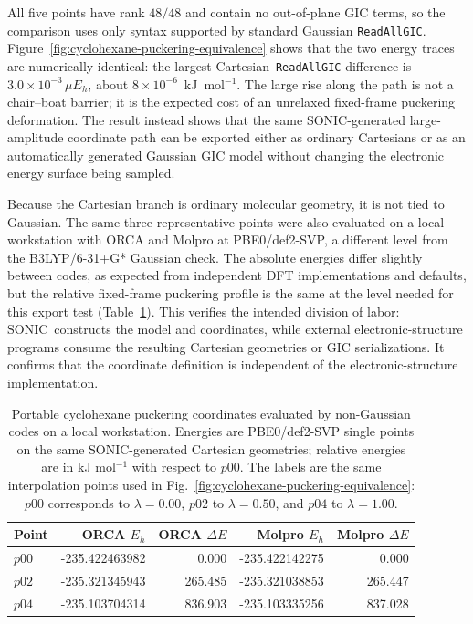 \documentclass[journal=jctcce,manuscript=article,layout=traditional]{achemso}
\newcommand{\SONIC}{SONIC}
\theoremstyle{definition}
\begin{document}
All five points have rank \(48/48\) and contain no out-of-plane GIC terms, so
the comparison uses only syntax supported by standard Gaussian
\texttt{ReadAllGIC}.  Figure~\ref{fig:cyclohexane-puckering-equivalence} shows
that the two energy traces are numerically identical: the largest
Cartesian--\texttt{ReadAllGIC} difference is \(3.0\times10^{-3}\,\mu E_h\),
about \(8\times10^{-6}\)~kJ~mol\(^{-1}\).  The large rise along the path is not
a chair--boat barrier; it is the expected cost of an unrelaxed fixed-frame
puckering deformation.  The result instead shows that the same \SONIC{}-generated
large-amplitude coordinate path can be exported either as ordinary Cartesians or
as an automatically generated Gaussian GIC model without changing the electronic
energy surface being sampled.

Because the Cartesian branch is ordinary molecular geometry, it is not tied to
Gaussian.  The same three representative points were also evaluated on a local
workstation with ORCA and Molpro at PBE0/def2-SVP, a different level from
the B3LYP/6-31+G* Gaussian check.  The absolute energies differ slightly
between codes, as expected from independent DFT implementations and defaults,
but the relative fixed-frame puckering profile is the same at the level needed
for this export test (Table~\ref{tab:external-codes}).  This verifies the
intended division of labor: \SONIC\ constructs the model and coordinates, while
external electronic-structure programs consume the resulting Cartesian
geometries or GIC serializations.  It confirms that the coordinate definition is
independent of the electronic-structure implementation.

\begin{table}[htbp]
\centering
\caption{Portable cyclohexane puckering coordinates evaluated by non-Gaussian
codes on a local workstation.  Energies are PBE0/def2-SVP single points on the same
\SONIC{}-generated Cartesian geometries; relative energies are in kJ mol\(^{-1}\)
with respect to \(p00\).  The labels are the same interpolation points used in
Fig.~\ref{fig:cyclohexane-puckering-equivalence}: \(p00\) corresponds to
\(\lambda=0.00\), \(p02\) to \(\lambda=0.50\), and \(p04\) to
\(\lambda=1.00\).}
\label{tab:external-codes}
\begin{tabular}{lrrrr}
\toprule
Point & ORCA \(E_h\) & ORCA \(\Delta E\) & Molpro \(E_h\) & Molpro \(\Delta E\) \\
\midrule
\(p00\) & -235.422463982 & 0.000 & -235.422142275 & 0.000 \\
\(p02\) & -235.321345943 & 265.485 & -235.321038853 & 265.447 \\
\(p04\) & -235.103704314 & 836.903 & -235.103335256 & 837.028 \\
\bottomrule
\end{tabular}
\end{table}
\end{document}
